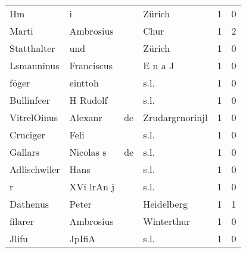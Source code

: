 \begin{center}
\begin{tiny}
\begin{longtabu}{llllrr}
                       Hm &                                  i &             &                                      Zürich &          1 &         0 \\
                    Marti &                          Ambrosius &             &                                        Chur &          1 &         2 \\
              Statthalter &                                und &             &                                      Zürich &          1 &         0 \\
               Lsmanninus &                         Franciscus &             &                                     E n a J &          1 &         0 \\
                    föger &                            einttoh &             &                                        s.l. &          1 &         0 \\
               Bullinfcer &                           H Rudolf &             &                                        s.l. &          1 &         0 \\
              VitrelOinus &                            Alexanr &          de &                             Zrudargrnorinjl &          1 &         0 \\
                 Cruciger &                               Feli &             &                                        s.l. &          1 &         0 \\
                  Gallars &                          Nicolas s &          de &                                        s.l. &          1 &         0 \\
             Adlischwiler &                               Hans &             &                                        s.l. &          1 &         0 \\
                        r &                         XVi lrAn j &             &                                        s.l. &          1 &         0 \\
                 Dathenus &                              Peter &             &                                  Heidelberg &          1 &         1 \\
                  filarer &                          Ambrosius &             &                                  Winterthur &          1 &         0 \\
                    Jlifu &                             JpIfiA &             &                                        s.l. &          1 &         0 \\

\end{longtabu}
\end{tiny}
\end{center}
